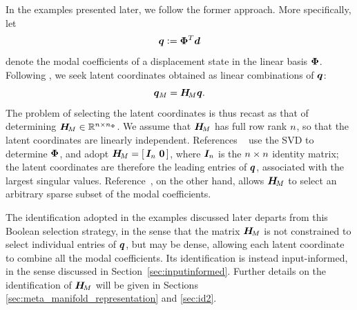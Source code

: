 \documentclass[preprint,10pt]{elsarticle}  %
\begin{document}
In the examples presented later, we follow the former approach. More specifically,  let
\begin{equation}
\label{eq:qrom_definition}
    \bm{q}
    \mathrel{\mathop:}=
    \bm{\Phi}^T\bm{d}
\end{equation}
denote the modal coefficients of a displacement state in the linear
basis \(\bm{\Phi}\). Following  \cite{barnett2022quadratic,barnett2023neural,ares2026nonlinear,koike2026sparse}, we seek latent
coordinates   obtained as
linear combinations of  \(\bm{q}\):
\begin{equation}
\label{eq:qMdefq}
    \bm{q}_M=\bm{H}_{\!M}\bm{q}.
\end{equation}
The problem of selecting the latent coordinates is thus recast as that
of determining
\(\bm{H}_{\!M}\in\mathbb{R}^{n \times n_{\Phi}}\). We assume that \(\bm{H}_{\!M}\) has full row rank \(n\), so that the latent coordinates are linearly independent. References ~\cite{barnett2022quadratic,
barnett2023neural,ares2026nonlinear} use the SVD to determine $\bm{\Phi}$, and  adopt $\bm{H}_{\!M}=[\,\bm{I}_{n}\ \bm{0}\,]$,
where \(\bm{I}_{n}\) is the \(n\times n\) identity matrix; the
latent coordinates are therefore the leading entries of \(\bm{q}\),
associated with the largest singular values.    Reference~\cite{koike2026sparse}, on the other hand,  allows  \(\bm{H}_{\!M}\) to select an arbitrary sparse
subset of the modal coefficients.




The identification adopted in the examples discussed later departs from this Boolean selection
strategy, in the sense that the matrix \(\bm{H}_{\!M}\) is not constrained to
select individual entries of \(\bm{q}\), but may be dense, allowing each
latent coordinate to combine all the modal coefficients. Its
identification is instead input-informed, in the sense discussed in
Section~\ref{sec:inputinformed}. Further details on the identification of $\bm{H}_{\!M}$ will be given in Sections \ref{sec:meta_manifold_representation} and \ref{sec:id2}.

%
%
\end{document}

